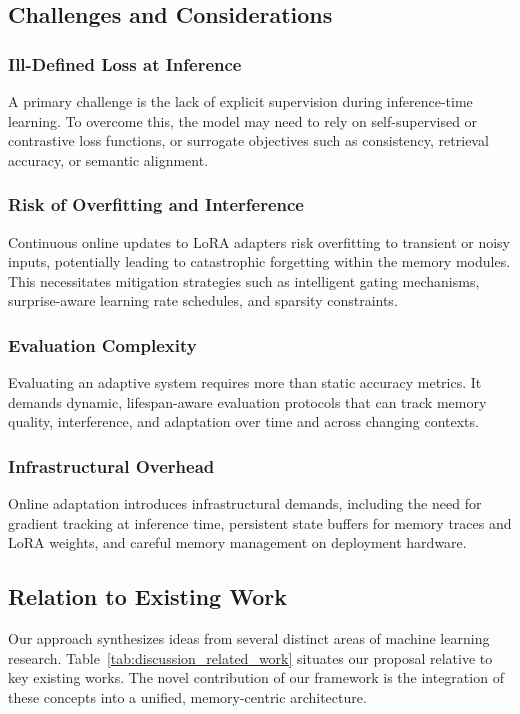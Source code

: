 \subsection{Challenges and Considerations}

\subsubsection{Ill-Defined Loss at Inference}
A primary challenge is the lack of explicit supervision during
inference-time learning. To overcome this, the model may need to rely on
self-supervised or contrastive loss functions, or surrogate objectives
such as consistency, retrieval accuracy, or semantic alignment.

\subsubsection{Risk of Overfitting and Interference}
Continuous online updates to LoRA adapters risk overfitting to transient
or noisy inputs, potentially leading to catastrophic forgetting within
the memory modules. This necessitates mitigation strategies such as
intelligent gating mechanisms, surprise-aware learning rate schedules,
and sparsity constraints.

\subsubsection{Evaluation Complexity}
Evaluating an adaptive system requires more than static accuracy metrics.
It demands dynamic, lifespan-aware evaluation protocols that can track
memory quality, interference, and adaptation over time and across
changing contexts.

\subsubsection{Infrastructural Overhead}
Online adaptation introduces infrastructural demands, including the need
for gradient tracking at inference time, persistent state buffers for
memory traces and LoRA weights, and careful memory management on
deployment hardware.

\subsection{Relation to Existing Work}
Our approach synthesizes ideas from several distinct areas of machine
learning research. Table~\ref{tab:discussion_related_work} situates our
proposal relative to key existing works. The novel contribution of our
framework is the integration of these concepts into a unified,
memory-centric architecture.

